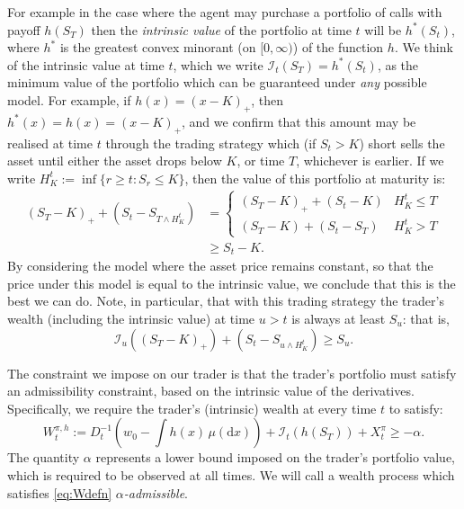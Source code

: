 \documentclass[a4paper]{amsart}
\theoremstyle{definition}
\theoremstyle{remark}
\numberwithin{equation}{section}
\newcommand{\dx}{\mathrm{d}x}
\newcommand{\In}{\mathcal{I}} %
\begin{document}
For example in the case where the agent may purchase a portfolio of calls with payoff $h(S_T)$ then the \emph{intrinsic value} of the portfolio at time $t$ will be $h^*(S_t)$, where $h^*$ is the greatest convex minorant (on $[0,\infty)$) of the function $h$. We think of the intrinsic value at time $t$, which we write $\In_t(S_T) = h^*(S_t)$, as the minimum value of the portfolio which can be guaranteed under \emph{any} possible model. For example, if $h(x) = (x-K)_+$, then $h^*(x) = h(x) = (x-K)_+$, and we confirm that this amount may be realised at time $t$ through the trading strategy which (if $S_t >K$) short sells the asset until either the asset drops below $K$, or time $T$, whichever is earlier. If we write $H^t_K:= \inf \{r \ge t: S_r \le K\}$, then the value of this portfolio at maturity is:
\begin{align*}
  (S_T-K)_+ + (S_t-S_{T \wedge H^t_K}) 
  & = 
    \begin{cases}
      (S_T - K)_+ + (S_t - K) & H^t_K \le T\\
      (S_T - K) + (S_t-S_T) & H^t_K > T
    \end{cases}
  \\
  & \ge S_t - K.
\end{align*}
By considering the model where the asset price remains constant, so that the price under this model is equal to the intrinsic value, we conclude that this is the best we can do. Note, in particular, that with this trading strategy the trader's wealth (including the intrinsic value) at time $u>t$ is always at least $S_u$: that is,
\begin{equation*}
  \In_u((S_T-K)_+) + (S_t-S_{u \wedge H^t_K}) \ge S_u.
\end{equation*}

The constraint we impose on our trader is that the trader's portfolio must satisfy an admissibility constraint, based on the intrinsic value of the derivatives. Specifically, we require the trader's (intrinsic) wealth at every time $t$ to satisfy:
\begin{equation}\label{eq:Wdefn}
  W_t^{\pi,h} := D_t^{-1}(w_0  - \int h(x) \, \mu(\dx))+ \In_t(h(S_T)) + X_t^{\pi} \ge -\alpha.
\end{equation}
The quantity $\alpha$ represents a lower bound imposed on the trader's portfolio value, which is required to be observed at all times. We will call a wealth process which satisfies \eqref{eq:Wdefn} \emph{$\alpha$-admissible}.
\end{document}
